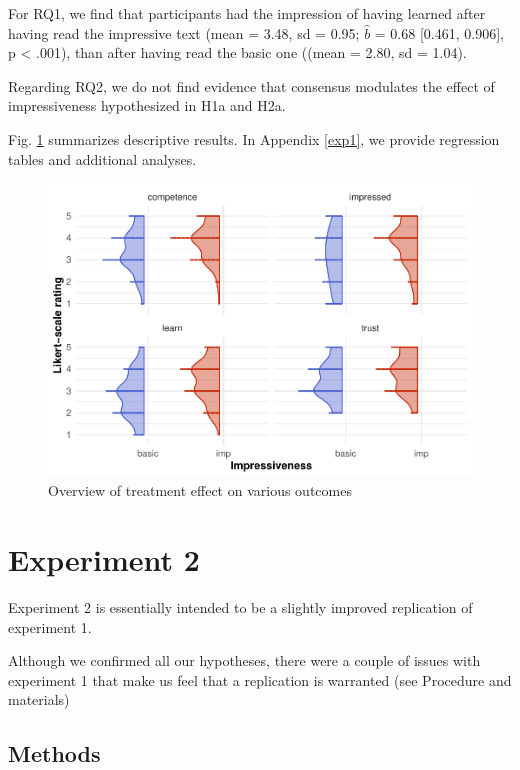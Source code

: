 \documentclass[
  doc,floatsintext]{apa6}
\begin{document}
For RQ1, we find that participants had the impression of having learned after having read the impressive text (mean = 3.48, sd = 0.95; \(\hat{b}\) = 0.68 {[}0.461, 0.906{]}, p \textless{} .001), than after having read the basic one ((mean = 2.80, sd = 1.04).

Regarding RQ2, we do not find evidence that consensus modulates the effect of impressiveness hypothesized in H1a and H2a.

Fig. \ref{fig:exp1-plot} summarizes descriptive results. In Appendix \ref{exp1}, we provide regression tables and additional analyses.



\begin{figure}
\centering
\includegraphics{output/figures/exp1-plot.pdf}
\caption{\label{fig:exp1-plot}Overview of treatment effect on various outcomes}
\end{figure}

\newpage

\hypertarget{experiment-2}{%
\section{Experiment 2}\label{experiment-2}}

Experiment 2 is essentially intended to be a slightly improved replication of experiment 1.

Although we confirmed all our hypotheses, there were a couple of issues with experiment 1 that make us feel that a replication is warranted (see Procedure and materials)

\hypertarget{methods-1}{%
\subsection{Methods}\label{methods-1}}
\end{document}
